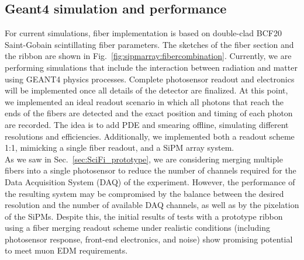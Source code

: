 \begin{refsection}
    \subsection{Geant4 simulation and performance}
    \label{sec:muEDM:fiber:g4}
        For current simulations, fiber implementation is based on double-clad BCF20 Saint-Gobain scintillating fiber parameters.
        The sketches of the fiber section and the ribbon are shown in Fig.~\ref{fig:sipmarray:fibercombination}.
        Currently, we are performing simulations that include the interaction between radiation and matter using \textsc{GEANT4} physics processes. 
        Complete photosensor readout and electronics will be implemented once all details of the detector are finalized. 
        At this point, we implemented an ideal readout scenario in which all photons that reach the ends of the fibers are detected and the exact position and timing of each photon are recorded. 
        The idea is to add PDE and smearing offline, simulating different resolutions and efficiencies.
        Additionally, we implemented both a readout scheme 1:1, mimicking a single fiber readout, and a SiPM array system.\\

        \noindent
        As we saw in Sec.~\ref{sec:SciFi_prototype}, we are considering merging multiple fibers into a single photosensor to reduce the number of channels required for the Data Acquisition System (DAQ) of the experiment. 
        However, the performance of the resulting system may be compromised by the balance between the desired resolution and the number of available DAQ channels, as well as by the pixelation of the SiPMs. 
        Despite this, the initial results of tests with a prototype ribbon using a fiber merging readout scheme under realistic conditions (including photosensor response, front-end electronics, and noise) show promising potential to meet muon EDM requirements.


\end{refsection}
